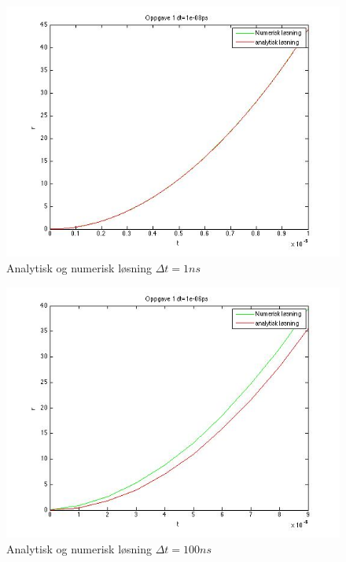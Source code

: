 \documentclass[12pt,a4paper,final,leqno]{report}
\begin{document}
\begin{figure}[H]
\caption{Analytisk og numerisk løsning $\Delta t=1ns$}
\centering
\includegraphics[width=\textwidth]{oppgave1analyticnumeric.jpg}
\end{figure}
\begin{figure}[H]
\caption{Analytisk og numerisk løsning $\Delta t=100ns$}
\centering
\includegraphics[width=\textwidth]{oppgave1analyticnumericdt2.jpg}
\end{figure}
\end{document}
